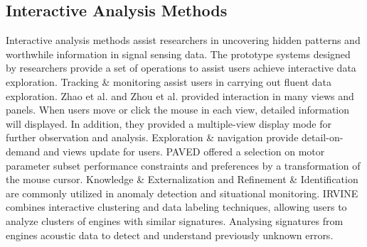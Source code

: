 \documentclass[a4paper,fleqn]{cas-dc}
\begin{document}
\subsection{Interactive Analysis Methods}
Interactive analysis methods assist researchers in uncovering hidden patterns and worthwhile information in signal sensing data.
The prototype systems \cite{eirich2021irvine, narechania2020safetylens, suschnigg2020exploration, zhao2019visual, Zhou2018} designed by researchers provide a set of operations to assist users achieve interactive data exploration. 
Tracking \& monitoring assist users in carrying out fluent data exploration.
Zhao et al. \cite{zhao2019visual} and Zhou et al. \cite{Zhou2018} provided interaction in many views and panels. When users move or click the mouse in each view, detailed information will displayed. In addition, they provided a multiple-view display mode for further observation and analysis. 
Exploration \& navigation provide detail-on-demand and views update for users.
PAVED \cite{cibulski2020paved} offered a selection on motor parameter subset performance constraints and preferences by a transformation of the mouse cursor.
Knowledge \& Externalization and Refinement \& Identification are commonly utilized in anomaly detection and situational monitoring.
IRVINE \cite{eirich2021irvine} combines interactive clustering and data labeling techniques, allowing users to analyze clusters of engines with similar signatures. Analysing signatures from engines acoustic data to detect and understand previously unknown errors.
\end{document}
